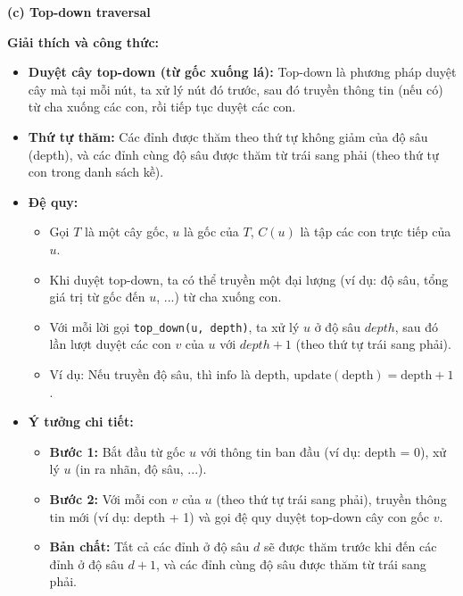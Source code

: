 \documentclass{article}
\begin{document}


\textbf{(c) Top-down traversal}

\textbf{Giải thích và công thức:}

\begin{itemize}
    \item \textbf{Duyệt cây top-down (từ gốc xuống lá):} Top-down là phương pháp duyệt cây mà tại mỗi nút, ta xử lý nút đó trước, sau đó truyền thông tin (nếu có) từ cha xuống các con, rồi tiếp tục duyệt các con. 
    \item \textbf{Thứ tự thăm:} Các đỉnh được thăm theo thứ tự không giảm của độ sâu (depth), và các đỉnh cùng độ sâu được thăm từ trái sang phải (theo thứ tự con trong danh sách kề).
    \item \textbf{Đệ quy:}
    \begin{itemize}
        \item Gọi $T$ là một cây gốc, $u$ là gốc của $T$, $C(u)$ là tập các con trực tiếp của $u$.
        \item Khi duyệt top-down, ta có thể truyền một đại lượng (ví dụ: độ sâu, tổng giá trị từ gốc đến $u$, ...) từ cha xuống con.
        \item Với mỗi lời gọi \texttt{top\_down(u, depth)}, ta xử lý $u$ ở độ sâu $depth$, sau đó lần lượt duyệt các con $v$ của $u$ với $depth+1$ (theo thứ tự trái sang phải).
        \item Ví dụ: Nếu truyền độ sâu, thì $\text{info}$ là $\text{depth}$, $\text{update}(\text{depth}) = \text{depth} + 1$.
    \end{itemize}
    \item \textbf{Ý tưởng chi tiết:}
    \begin{itemize}
        \item \textbf{Bước 1:} Bắt đầu từ gốc $u$ với thông tin ban đầu (ví dụ: depth = 0), xử lý $u$ (in ra nhãn, độ sâu, ...).
        \item \textbf{Bước 2:} Với mỗi con $v$ của $u$ (theo thứ tự trái sang phải), truyền thông tin mới (ví dụ: depth + 1) và gọi đệ quy duyệt top-down cây con gốc $v$.
        \item \textbf{Bản chất:} Tất cả các đỉnh ở độ sâu $d$ sẽ được thăm trước khi đến các đỉnh ở độ sâu $d+1$, và các đỉnh cùng độ sâu được thăm từ trái sang phải.
    \end{itemize}
\end{itemize}
\end{document}
